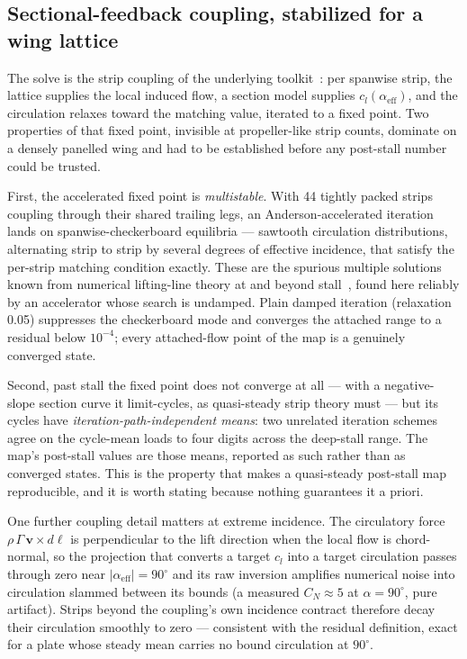 \documentclass[submit]{aiaa-tc}
\begin{document}
\subsection{Sectional-feedback coupling, stabilized for a wing lattice}

The solve is the strip coupling of the underlying
toolkit~\cite{aeolion2026}: per spanwise strip, the lattice supplies the
local induced flow, a section model supplies
$c_l(\alpha_{\text{eff}})$, and the circulation relaxes toward the
matching value, iterated to a fixed point. Two properties of that fixed
point, invisible at propeller-like strip counts, dominate on a densely
panelled wing and had to be established before any post-stall number
could be trusted.

First, the accelerated fixed point is \emph{multistable}. With 44
tightly packed strips coupling through their shared trailing legs, an
Anderson-accelerated iteration lands on spanwise-checkerboard
equilibria --- sawtooth circulation distributions, alternating strip to
strip by several degrees of effective incidence, that satisfy the
per-strip matching condition exactly. These are the spurious multiple
solutions known from numerical lifting-line theory at and beyond
stall~\cite{anderson1980spoiler}, found here reliably by an accelerator
whose search is undamped. Plain damped iteration (relaxation 0.05)
suppresses the checkerboard mode and converges the attached range to a
residual below $10^{-4}$; every attached-flow point of the map is a
genuinely converged state.

Second, past stall the fixed point does not converge at all --- with a
negative-slope section curve it limit-cycles, as quasi-steady strip
theory must --- but its cycles have \emph{iteration-path-independent
means}: two unrelated iteration schemes agree on the cycle-mean loads to
four digits across the deep-stall range. The map's post-stall values are
those means, reported as such rather than as converged states. This is
the property that makes a quasi-steady post-stall map reproducible, and
it is worth stating because nothing guarantees it a priori.

One further coupling detail matters at extreme incidence. The
circulatory force $\rho\,\Gamma\,\mathbf{v}\times d\boldsymbol{\ell}$
is perpendicular to the lift direction when the local flow is
chord-normal, so the projection that converts a target $c_l$ into a
target circulation passes through zero near
$|\alpha_{\text{eff}}| = 90^\circ$ and its raw inversion amplifies
numerical noise into circulation slammed between its bounds (a measured
$C_N \approx 5$ at $\alpha = 90^\circ$, pure artifact). Strips beyond
the coupling's own incidence contract therefore decay their circulation
smoothly to zero --- consistent with the residual definition, exact for
a plate whose steady mean carries no bound circulation at $90^\circ$.
\end{document}
